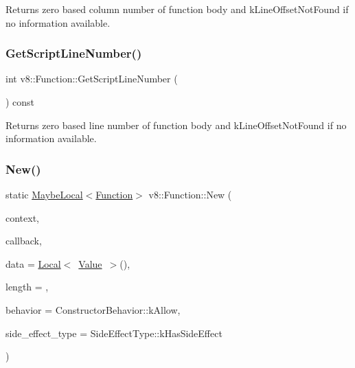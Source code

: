 Returns zero based column number of function body and k\+Line\+Offset\+Not\+Found if no information available. \mbox{\label{classv8_1_1Function_a616f966e538ec32182acd4acb7ee70bc}} 
\subsubsection{\texorpdfstring{Get\+Script\+Line\+Number()}{GetScriptLineNumber()}}
{\footnotesize\ttfamily int v8\+::\+Function\+::\+Get\+Script\+Line\+Number (\begin{DoxyParamCaption}{ }\end{DoxyParamCaption}) const}

Returns zero based line number of function body and k\+Line\+Offset\+Not\+Found if no information available. \mbox{\label{classv8_1_1Function_afc51cb2669c3f8b6035c2a7f813d0040}} 
\subsubsection{\texorpdfstring{New()}{New()}}
{\footnotesize\ttfamily static \mbox{\hyperlink{classv8_1_1MaybeLocal}{Maybe\+Local}}$<$\mbox{\hyperlink{classv8_1_1Function}{Function}}$>$ v8\+::\+Function\+::\+New (\begin{DoxyParamCaption}\item[{\mbox{\hyperlink{classv8_1_1Local}{Local}}$<$ Context $>$}]{context,  }\item[{Function\+Callback}]{callback,  }\item[{\mbox{\hyperlink{classv8_1_1Local}{Local}}$<$ \mbox{\hyperlink{classv8_1_1Value}{Value}} $>$}]{data = {\ttfamily \mbox{\hyperlink{classv8_1_1Local}{Local}}$<$~\mbox{\hyperlink{classv8_1_1Value}{Value}}~$>$()},  }\item[{int}]{length = {},  }\item[{Constructor\+Behavior}]{behavior = {\ttfamily ConstructorBehavior\+:\+:kAllow},  }\item[{\mbox{\hyperlink{namespacev8_a29711319c2b9fc7716d65faee2f7b9cb}{Side\+Effect\+Type}}}]{side\+\_\+effect\+\_\+type = {\ttfamily SideEffectType\+:\+:kHasSideEffect} }\end{DoxyParamCaption})\hspace{0.3cm}{\ttfamily [static]}}

